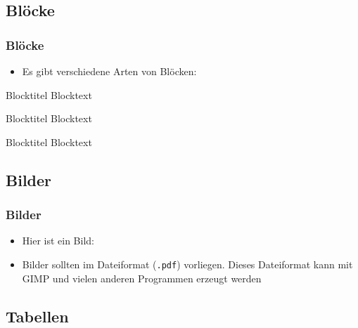 \documentclass{beamer}
\begin{document}
\subsection{Blöcke}

\begin{frame}[t]
\frametitle{Blöcke}
\begin{itemize}
\item Es gibt verschiedene Arten von Blöcken:
\end{itemize}
\begin{block}{Blocktitel}
Blocktext
\end{block}

\begin{exampleblock}{Blocktitel}
Blocktext
\end{exampleblock}

\begin{alertblock}{Blocktitel}
Blocktext
\end{alertblock}
\end{frame}

\subsection{Bilder}

\begin{frame}
\frametitle{Bilder}
\begin{itemize}
\item Hier ist ein Bild:
\end{itemize}
\begin{center}
\end{center}
\begin{itemize}
\item Bilder sollten im Dateiformat (\texttt{.pdf}) vorliegen. Dieses Dateiformat kann mit GIMP und vielen anderen Programmen erzeugt werden
\end{itemize}
\end{frame}

\subsection{Tabellen}
\end{document}
